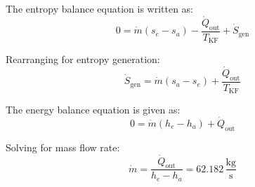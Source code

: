 The entropy balance equation is written as:  
\[
0 = \dot{m} (s_e - s_a) - \frac{\dot{Q}_{\text{out}}}{T_{\text{KF}}} + \dot{S}_{\text{gen}}
\]  

Rearranging for entropy generation:  
\[
\dot{S}_{\text{gen}} = \dot{m} (s_a - s_e) + \frac{\dot{Q}_{\text{out}}}{T_{\text{KF}}}
\]  

The energy balance equation is given as:  
\[
0 = \dot{m} (h_e - h_a) + \dot{Q}_{\text{out}}
\]  

Solving for mass flow rate:  
\[
\dot{m} = \frac{\dot{Q}_{\text{out}}}{h_e - h_a} = 62.182 \, \frac{\text{kg}}{\text{s}}
\]